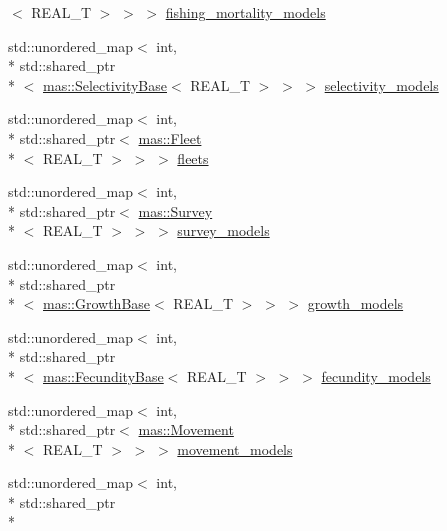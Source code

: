 \begin{DoxyCompactItemize}
$<$ R\-E\-A\-L\-\_\-\-T $>$ $>$ $>$ \hyperlink{classmas_1_1_information_a104fa47bf1c9f21b186059d4897f0dad}{fishing\-\_\-mortality\-\_\-models}
\item 
std\-::unordered\-\_\-map$<$ int, \\*
std\-::shared\-\_\-ptr\\*
$<$ \hyperlink{structmas_1_1_selectivity_base}{mas\-::\-Selectivity\-Base}$<$ R\-E\-A\-L\-\_\-\-T $>$ $>$ $>$ \hyperlink{classmas_1_1_information_ae771fa7c04d112e57d58ade01645d298}{selectivity\-\_\-models}
\item 
std\-::unordered\-\_\-map$<$ int, \\*
std\-::shared\-\_\-ptr$<$ \hyperlink{structmas_1_1_fleet}{mas\-::\-Fleet}\\*
$<$ R\-E\-A\-L\-\_\-\-T $>$ $>$ $>$ \hyperlink{classmas_1_1_information_a2790d8daab0d9435a246dd9823772500}{fleets}
\item 
std\-::unordered\-\_\-map$<$ int, \\*
std\-::shared\-\_\-ptr$<$ \hyperlink{structmas_1_1_survey}{mas\-::\-Survey}\\*
$<$ R\-E\-A\-L\-\_\-\-T $>$ $>$ $>$ \hyperlink{classmas_1_1_information_ad9eb1c49a6565f76e0605afdb39fa8fa}{survey\-\_\-models}
\item 
std\-::unordered\-\_\-map$<$ int, \\*
std\-::shared\-\_\-ptr\\*
$<$ \hyperlink{structmas_1_1_growth_base}{mas\-::\-Growth\-Base}$<$ R\-E\-A\-L\-\_\-\-T $>$ $>$ $>$ \hyperlink{classmas_1_1_information_a0088dd940274db906032cd1d91abdedc}{growth\-\_\-models}
\item 
std\-::unordered\-\_\-map$<$ int, \\*
std\-::shared\-\_\-ptr\\*
$<$ \hyperlink{structmas_1_1_fecundity_base}{mas\-::\-Fecundity\-Base}$<$ R\-E\-A\-L\-\_\-\-T $>$ $>$ $>$ \hyperlink{classmas_1_1_information_ac4ed9602f5cf956d2225e2cfc9ec84c1}{fecundity\-\_\-models}
\item 
std\-::unordered\-\_\-map$<$ int, \\*
std\-::shared\-\_\-ptr$<$ \hyperlink{structmas_1_1_movement}{mas\-::\-Movement}\\*
$<$ R\-E\-A\-L\-\_\-\-T $>$ $>$ $>$ \hyperlink{classmas_1_1_information_a0e3fd8c389a107440c7e5e57fe933527}{movement\-\_\-models}
\item 
std\-::unordered\-\_\-map$<$ int, \\*
std\-::shared\-\_\-ptr\\*

\end{DoxyCompactItemize}
